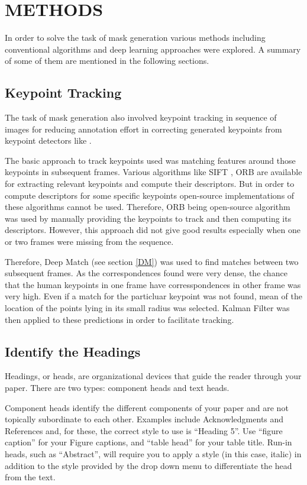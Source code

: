\documentclass[conference]{IEEEtran}
\begin{document}
\section{METHODS}
In order to solve the task of mask generation various methods including conventional algorithms and deep learning approaches were explored. A summary of some of them are mentioned in the following sections. 

\subsection{Keypoint Tracking}
The task of mask generation also involved keypoint tracking in sequence of images for reducing annotation effort in correcting generated keypoints from keypoint detectors like \cite{poseAE}.

The basic approach to track keypoints used was matching features around those keypoints in subsequent frames. Various algorithms like SIFT \cite{sift}, ORB \cite{orb} are available for extracting relevant keypoints and compute their descriptors. But in order to compute descriptors for some specific keypoints open-source implementations of these algorithms cannot be used. Therefore, ORB being open-source algorithm was used by manually providing the keypoints to track and then computing its descriptors. However, this approach did not give good results especially when one or two frames were missing from the sequence. 

Therefore, Deep Match (see section \ref{DM}) was used to find matches between two subsequent frames. As the correspondences found were very dense, the chance that the human keypoints in one frame have corresspondences in other frame was very high. Even if a match for the particluar keypoint was not found, mean of the location of the points lying in its small radius was selected. Kalman Filter was then applied to these predictions in order to facilitate tracking.

\subsection{Identify the Headings}
Headings, or heads, are organizational devices that guide the reader through 
your paper. There are two types: component heads and text heads.

Component heads identify the different components of your paper and are not 
topically subordinate to each other. Examples include Acknowledgments and 
References and, for these, the correct style to use is ``Heading 5''. Use 
``figure caption'' for your Figure captions, and ``table head'' for your 
table title. Run-in heads, such as ``Abstract'', will require you to apply a 
style (in this case, italic) in addition to the style provided by the drop 
down menu to differentiate the head from the text.
\end{document}
